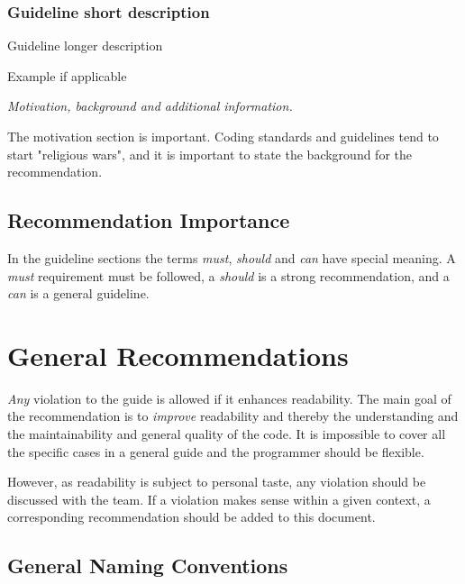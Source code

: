 \documentclass[a4paper,11pt,oneside]{scrbook}
\newcommand{\guideline}[1]{{\subsection{#1}}}
\newcommand{\motivation}[1]{{\normalfont \itshape #1}}
\begin{document}
\guideline{Guideline short description}

Guideline longer description

\begin{code}
  Example if applicable
\end{code}
   
\motivation{
  Motivation, background and additional information.
}

The motivation section is important. Coding standards and guidelines
tend to start "religious wars", and it is important to state the
background for the recommendation.

\section{Recommendation Importance}

In the guideline sections the terms \emph{must}, \emph{should} and \emph{can}
have special meaning. A \emph{must} requirement must be followed, a
\emph{should} is a strong recommendation, and a \emph{can} is a general
guideline.

\chapter{General Recommendations}

\emph{Any} violation to the guide is allowed if it enhances readability.  The
main goal of the recommendation is to \emph{improve} readability and thereby the
understanding and the maintainability and general quality of the code. It is
impossible to cover all the specific cases in a general guide and the programmer
should be flexible.

However, as readability is subject to personal taste, any violation should be
discussed with the team. If a violation makes sense within a given context, a
corresponding recommendation should be added to this document.

\section{General Naming Conventions}
\label{sec:general-naming-conventions}
\end{document}
